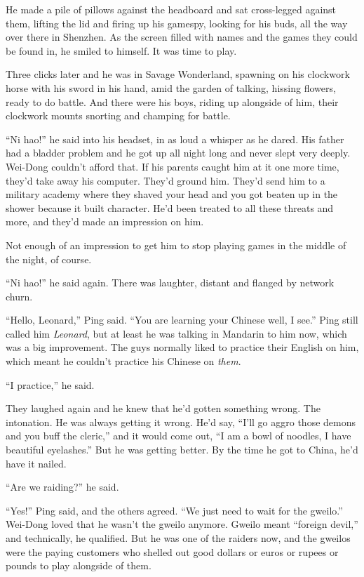 He made a pile of pillows against the headboard and sat
cross-legged against them, lifting the lid and firing up his
gamespy, looking for his buds, all the way over there in Shenzhen.
As the screen filled with names and the games they could be found
in, he smiled to himself. It was time to play.

Three clicks later and he was in Savage Wonderland, spawning on his
clockwork horse with his sword in his hand, amid the garden of
talking, hissing flowers, ready to do battle. And there were his
boys, riding up alongside of him, their clockwork mounts snorting
and champing for battle.

``Ni hao!'' he said into his headset, in as loud a whisper as he
dared. His father had a bladder problem and he got up all night
long and never slept very deeply. Wei-Dong couldn't afford that. If
his parents caught him at it one more time, they'd take away his
computer. They'd ground him. They'd send him to a military academy
where they shaved your head and you got beaten up in the shower
because it built character. He'd been treated to all these threats
and more, and they'd made an impression on him.

Not enough of an impression to get him to stop playing games in the
middle of the night, of course.

``Ni hao!'' he said again. There was laughter, distant and flanged by
network churn.

``Hello, Leonard,'' Ping said. ``You are learning your Chinese well, I
see.'' Ping still called him \emph{Leonard}, but at least he was
talking in Mandarin to him now, which was a big improvement. The
guys normally liked to practice their English on him, which meant
he couldn't practice his Chinese on \emph{them}.

``I practice,'' he said.

They laughed again and he knew that he'd gotten something wrong.
The intonation. He was always getting it wrong. He'd say, ``I'll go
aggro those demons and you buff the cleric,'' and it would come out,
``I am a bowl of noodles, I have beautiful eyelashes.'' But he was
getting better. By the time he got to China, he'd have it nailed.

``Are we raiding?'' he said.

``Yes!'' Ping said, and the others agreed. ``We just need to wait for
the gweilo.'' Wei-Dong loved that he wasn't the gweilo anymore.
Gweilo meant ``foreign devil,'' and technically, he qualified. But he
was one of the raiders now, and the gweilos were the paying
customers who shelled out good dollars or euros or rupees or pounds
to play alongside of them.


